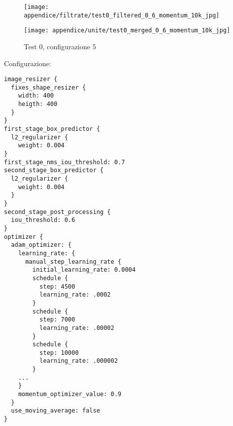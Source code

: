 \newpage
\begin{figure}[H]  
    \begin{minipage}{.5\columnwidth}  
        \centering  
        \texttt{[image: appendice/filtrate/test0\_filtered\_0\_6\_momentum\_10k\_jpg]}  
    \end{minipage}%
    \begin{minipage}{0.5\columnwidth}  
        \centering  
        \texttt{[image: appendice/unite/test0\_merged\_0\_6\_momentum\_10k\_jpg]}  
    \end{minipage}  
    \caption{Test 0, configurazione 5}
\end{figure}%
Configurazione:
\begin{multicols}{2}
    \begin{lstlisting}
image_resizer {
  fixes_shape_resizer {
    width: 400
    heigth: 400
  }
}
first_stage_box_predictor {
  l2_regularizer {
    weight: 0.004
}
first_stage_nms_iou_threshold: 0.7
second_stage_box_predictor {
  l2_regularizer {
    weight: 0.004
  }
}
second_stage_post_processing {
  iou_threshold: 0.6
}
optimizer {
  adam_optimizer: {
    learning_rate: {
      manual_step_learning_rate {
        initial_learning_rate: 0.0004
        schedule {
          step: 4500
          learning_rate: .0002
        }
        schedule {
          step: 7000
          learning_rate: .00002
        }
        schedule {
          step: 10000
          learning_rate: .000002
        }
    ...
    }
    momentum_optimizer_value: 0.9
  }
  use_moving_average: false
}
    \end{lstlisting}
\end{multicols}

